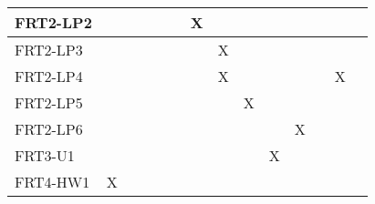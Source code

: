 \documentclass[12pt, titlepage]{article}
\begin{document}
\begin{table}[ht]
{\begin{tabular}{llllllllllllll}
\multicolumn{1}{|l|}{FRT2-LP2}   & \multicolumn{1}{l|}{}  & \multicolumn{1}{l|}{}  & \multicolumn{1}{l|}{}  & \multicolumn{1}{l|}{}  & \multicolumn{1}{l|}{}  & \multicolumn{1}{l|}{X} & \multicolumn{1}{l|}{}  & \multicolumn{1}{l|}{}  & \multicolumn{1}{l|}{}  & \multicolumn{1}{l|}{}   & \multicolumn{1}{l|}{}   & \multicolumn{1}{l|}{}   & \multicolumn{1}{l|}{}   \\ \hline
\multicolumn{1}{|l|}{FRT2-LP3}   & \multicolumn{1}{l|}{}  & \multicolumn{1}{l|}{}  & \multicolumn{1}{l|}{}  & \multicolumn{1}{l|}{}  & \multicolumn{1}{l|}{}  & \multicolumn{1}{l|}{}  & \multicolumn{1}{l|}{X} & \multicolumn{1}{l|}{}  & \multicolumn{1}{l|}{}  & \multicolumn{1}{l|}{}   & \multicolumn{1}{l|}{}   & \multicolumn{1}{l|}{}   & \multicolumn{1}{l|}{}   \\ \hline
\multicolumn{1}{|l|}{FRT2-LP4}   & \multicolumn{1}{l|}{}  & \multicolumn{1}{l|}{}  & \multicolumn{1}{l|}{}  & \multicolumn{1}{l|}{}  & \multicolumn{1}{l|}{}  & \multicolumn{1}{l|}{}  & \multicolumn{1}{l|}{X} & \multicolumn{1}{l|}{}  & \multicolumn{1}{l|}{}  & \multicolumn{1}{l|}{}   & \multicolumn{1}{l|}{}   & \multicolumn{1}{l|}{X}  & \multicolumn{1}{l|}{}   \\ \hline
\multicolumn{1}{|l|}{FRT2-LP5}   & \multicolumn{1}{l|}{}  & \multicolumn{1}{l|}{}  & \multicolumn{1}{l|}{}  & \multicolumn{1}{l|}{}  & \multicolumn{1}{l|}{}  & \multicolumn{1}{l|}{}  & \multicolumn{1}{l|}{}  & \multicolumn{1}{l|}{X} & \multicolumn{1}{l|}{}  & \multicolumn{1}{l|}{}   & \multicolumn{1}{l|}{}   & \multicolumn{1}{l|}{}   & \multicolumn{1}{l|}{}   \\ \hline
\multicolumn{1}{|l|}{FRT2-LP6}   & \multicolumn{1}{l|}{}  & \multicolumn{1}{l|}{}  & \multicolumn{1}{l|}{}  & \multicolumn{1}{l|}{}  & \multicolumn{1}{l|}{}  & \multicolumn{1}{l|}{}  & \multicolumn{1}{l|}{}  & \multicolumn{1}{l|}{}  & \multicolumn{1}{l|}{}  & \multicolumn{1}{l|}{X}  & \multicolumn{1}{l|}{}   & \multicolumn{1}{l|}{}   & \multicolumn{1}{l|}{}   \\ \hline
\multicolumn{1}{|l|}{FRT3-U1}    & \multicolumn{1}{l|}{}  & \multicolumn{1}{l|}{}  & \multicolumn{1}{l|}{}  & \multicolumn{1}{l|}{}  & \multicolumn{1}{l|}{}  & \multicolumn{1}{l|}{}  & \multicolumn{1}{l|}{}  & \multicolumn{1}{l|}{}  & \multicolumn{1}{l|}{X} & \multicolumn{1}{l|}{}   & \multicolumn{1}{l|}{}   & \multicolumn{1}{l|}{}   & \multicolumn{1}{l|}{}   \\ \hline
\multicolumn{1}{|l|}{FRT4-HW1}   & \multicolumn{1}{l|}{X} & \multicolumn{1}{l|}{}  & \multicolumn{1}{l|}{}  & \multicolumn{1}{l|}{}  & \multicolumn{1}{l|}{}  & \multicolumn{1}{l|}{}  & \multicolumn{1}{l|}{}  & \multicolumn{1}{l|}{}  & \multicolumn{1}{l|}{}  & \multicolumn{1}{l|}{}   & \multicolumn{1}{l|}{}   & \multicolumn{1}{l|}{}   & \multicolumn{1}{l|}{}   \\ \hline

\end{tabular}}
\end{table}
\end{document}
